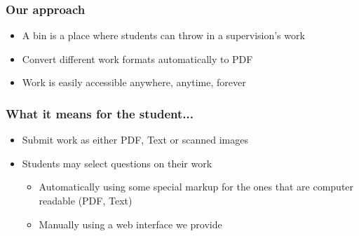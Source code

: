 \documentclass{beamer}
\begin{document}
    \begin{frame}
    \end{frame}
  	\begin{frame}
    	\frametitle{Our approach}
    	\begin{itemize}
        \item A bin is a place where students can throw in a supervision's work
    		\item Convert different work formats automatically to PDF 
    		\item Work is easily accessible anywhere, anytime, forever
    	\end{itemize}
    \end{frame}
    \begin{frame}
    	\frametitle{What it means for the student...}
    	\begin{itemize}
        
    		\item Submit work as either PDF, Text or scanned images
    		\item Students may select questions on their work
    		\begin{itemize}
    			\item Automatically using some special markup for the ones that are computer readable (PDF, Text)
    			\item Manually using a web interface we provide   			
        \end{itemize}
    	\end{itemize}    	
    \end{frame}
\end{document}
